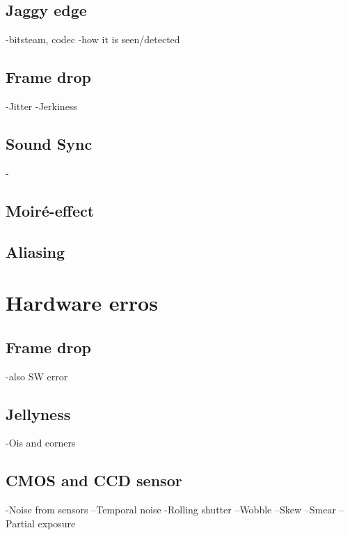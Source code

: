 \subsection{Jaggy edge}
-bitsteam, codec
-how it is seen/detected
\subsection{Frame drop}
-Jitter
-Jerkiness
\subsection{Sound Sync}
-
\subsection{Moir\'{e}-effect}
\subsection{Aliasing}
\section{Hardware  erros}
\subsection{Frame drop}
-also SW error
\subsection{Jellyness}
-Ois and corners
\subsection{CMOS and CCD sensor}
-Noise from sensors
--Temporal noise
-Rolling shutter
--Wobble
--Skew
--Smear
--Partial exposure









